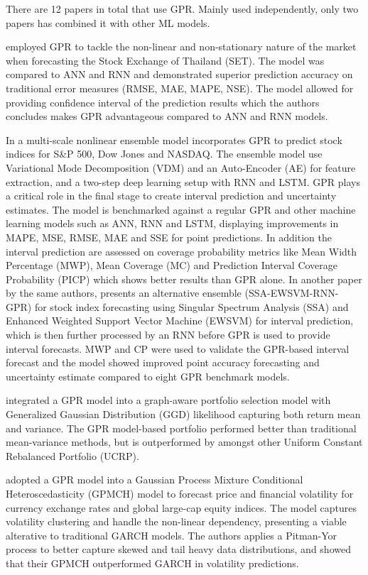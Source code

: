 There are 12 papers in total that use GPR. Mainly used independently, only two papers has combined it with other ML models. 

\textcite{Suphawan2022gpr} employed GPR to tackle the non-linear and non-stationary nature of the market when forecasting the Stock Exchange of Thailand (SET). The model was compared to ANN and RNN and demonstrated superior prediction accuracy on traditional error measures (RMSE, MAE, MAPE, NSE). The model allowed for providing confidence interval of the prediction results which the authors concludes makes GPR advantageous compared to ANN and RNN models.

In \textcite{Wang2021gpr} a multi-scale nonlinear ensemble model incorporates GPR to predict stock indices for S\&P 500, Dow Jones and NASDAQ. The ensemble model use Variational Mode Decomposition (VDM) and an Auto-Encoder (AE) for feature extraction, and a two-step deep learning setup with RNN and LSTM. GPR plays a critical role in the final stage to create interval prediction and uncertainty estimates. The model is benchmarked against a regular GPR and other machine learning models such as ANN, RNN and LSTM, displaying improvements in MAPE, MSE, RMSE, MAE and SSE for point predictions. In addition the interval prediction are assessed on coverage probability metrics like Mean Width Percentage (MWP), Mean Coverage (MC) and Prediction Interval Coverage Probability (PICP) which shows better results than GPR alone. In another paper by the same authors, \textcite{Wang2021gprensemble} presents an alternative ensemble (SSA-EWSVM-RNN-GPR) for stock index forecasting using Singular Spectrum Analysis (SSA) and Enhanced Weighted Support Vector Machine (EWSVM) for interval prediction, which is then further processed by an RNN before GPR is used to provide interval forecasts. MWP and CP were used to validate the GPR-based interval forecast and the model showed improved point accuracy forecasting and uncertainty estimate compared to eight GPR benchmark models.  

\textcite{Li2024gpr} integrated a GPR model into a graph-aware portfolio selection model with Generalized Gaussian Distribution (GGD) likelihood capturing both return mean and variance. The GPR model-based portfolio performed better than traditional mean-variance methods, but is outperformed by amongst other Uniform Constant Rebalanced Portfolio (UCRP).

\textcite{Platanios2014gpr} adopted a GPR model into a Gaussian Process Mixture Conditional Heteroscedasticity (GPMCH) model to forecast price and financial volatility for currency exchange rates and global large-cap equity indices. The model captures volatility clustering and handle the non-linear dependency, presenting a viable alterative to traditional GARCH models. The authors applies a Pitman-Yor process to better capture skewed and tail heavy data distributions, and showed that their GPMCH outperformed GARCH in volatility predictions.

